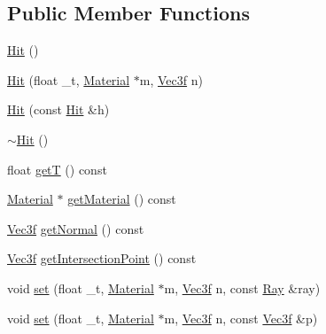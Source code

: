 \subsection*{Public Member Functions}
\begin{DoxyCompactItemize}
\item 
\hyperlink{classHit_ac2727a27933c07b60b6a7ccccba12fff}{Hit} ()
\item 
\hyperlink{classHit_a5a32f693b7c37fedfc0d2b357b03374a}{Hit} (float \+\_\+t, \hyperlink{classMaterial}{Material} $\ast$m, \hyperlink{classVec3f}{Vec3f} n)
\item 
\hyperlink{classHit_acb4d552eb2451c8310329e485a516d06}{Hit} (const \hyperlink{classHit}{Hit} \&h)
\item 
\hyperlink{classHit_a6b06024fcf4bc21acd339461a549dc7c}{$\sim$\+Hit} ()
\item 
float \hyperlink{classHit_af5ebbf2d4370f17826617ea7d441abd9}{get\+T} () const 
\item 
\hyperlink{classMaterial}{Material} $\ast$ \hyperlink{classHit_a8143afec295fb4418daf38d207692923}{get\+Material} () const 
\item 
\hyperlink{classVec3f}{Vec3f} \hyperlink{classHit_aaa0cbcac47165d07318bba5efdb574f2}{get\+Normal} () const 
\item 
\hyperlink{classVec3f}{Vec3f} \hyperlink{classHit_ac07b2cc6a362e066abc87b86ff4c281d}{get\+Intersection\+Point} () const 
\item 
void \hyperlink{classHit_a09dd5834765113b153e12665ec580d36}{set} (float \+\_\+t, \hyperlink{classMaterial}{Material} $\ast$m, \hyperlink{classVec3f}{Vec3f} n, const \hyperlink{classRay}{Ray} \&ray)
\item 
void \hyperlink{classHit_acb2283496ca855ff94de46f4058ab1b8}{set} (float \+\_\+t, \hyperlink{classMaterial}{Material} $\ast$m, \hyperlink{classVec3f}{Vec3f} n, const \hyperlink{classVec3f}{Vec3f} \&p)
\end{DoxyCompactItemize}


